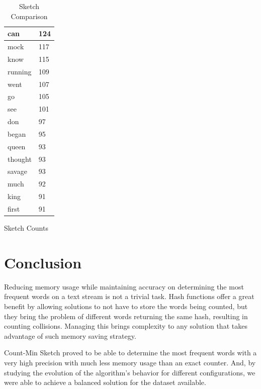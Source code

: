 \documentclass[shortpaper]{revdetua}
\begin{document}
\begin{table}[!htb]
\begin{subtable}{.5\linewidth}
\begin{tabular}{|l|l|}
            can     & 124    \\ \hline
            mock    & 117    \\ \hline
            know    & 115    \\ \hline
            running & 109    \\ \hline
            went    & 107    \\ \hline
            go      & 105    \\ \hline
            see     & 101    \\ \hline
            don     & 97     \\ \hline
            began   & 95     \\ \hline
            queen   & 93     \\ \hline
            thought & 93     \\ \hline
            savage  & 93     \\ \hline
            much    & 92     \\ \hline
            king    & 91     \\ \hline
            first   & 91     \\ \hline
        \end{tabular}
        \caption{Sketch Counts}
    \end{subtable} 
    \caption{Sketch Comparison}
\end{table}  


\newpage
\textbf{ }
\newpage
\section{Conclusion}

Reducing memory usage while maintaining accuracy on determining the most frequent words on a text stream is not a trivial task.
Hash functions offer a great benefit by allowing solutions to not have to store the words being counted, but they bring the problem of different words 
returning the same hash, resulting in counting collisions.
Managing this brings complexity to any solution that takes advantage of such memory saving strategy.

Count-Min Sketch proved to be able to determine the most frequent words with a very high precision with much less memory usage than an exact counter.
And, by studying the evolution of the algorithm's behavior for different configurations, we were able to achieve a balanced solution for the dataset available.
\end{document}
